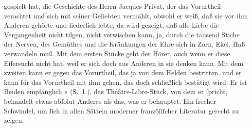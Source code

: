 {{{                     gespielt hat, die Geschichte des Herrn Jacques Privat, der das Vorurtheil verachtet und sich
                     mit seiner Geliebten vermählt, obwohl er weiß, daß sie vor ihm Anderen gehörte
                     und liederlich lebte; da wird gezeigt, daß alle Liebe die Vergangenheit nicht
                     tilgen, nicht verwischen kann, ja, durch die tausend Stiche der Nerven, des
                     Gemüthes und die Kränkungen der Ehre sich in Zorn, Ekel, Haß verwandeln muß.
                     Mit dem ersten Stücke
                     geht der Hörer, auch wenn er diese Eifersucht nicht hat, weil er sich doch aus
                     Anderen in sie denken kann. Mit dem zweiten kann er gegen das Vorurtheil, das ja von dem
                     Helden bestritten, und er kann für das Vorurtheil mit ihm gehen, das doch
                     schließlich bestätigt wird. Er ist Beiden empfänglich.«
                     (S. 1.)}}}\label{K_L02723-5}, das Théâtre-Libre-Stück, von dem er ſpricht,
               behandelt etwas abſolut Anderes als das, was er behauptet. Ein frecher Schwindel, um
               ſich in allen Sätteln moderner \introOben{}franzöſiſcher\introOben{}
               Literatur gerecht zu zeigen.\pend
           
